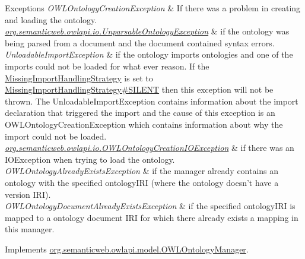 \begin{DoxyExceptions}{Exceptions}
{\em O\-W\-L\-Ontology\-Creation\-Exception} & If there was a problem in creating and loading the ontology. \\
\hline
{\em \hyperlink{classorg_1_1semanticweb_1_1owlapi_1_1io_1_1_unparsable_ontology_exception}{org.\-semanticweb.\-owlapi.\-io.\-Unparsable\-Ontology\-Exception}} & if the ontology was being parsed from a document and the document contained syntax errors. \\
\hline
{\em Unloadable\-Import\-Exception} & if the ontology imports ontologies and one of the imports could not be loaded for what ever reason. If the \hyperlink{}{Missing\-Import\-Handling\-Strategy} is set to \hyperlink{enumorg_1_1semanticweb_1_1owlapi_1_1model_1_1_missing_import_handling_strategy_aed66060ec95dc4ad59ca4dd82509782b}{Missing\-Import\-Handling\-Strategy\#\-S\-I\-L\-E\-N\-T} then this exception will not be thrown. The {\ttfamily Unloadable\-Import\-Exception} contains information about the import declaration that triggered the import and the cause of this exception is an {\ttfamily O\-W\-L\-Ontology\-Creation\-Exception} which contains information about why the import could not be loaded. \\
\hline
{\em \hyperlink{classorg_1_1semanticweb_1_1owlapi_1_1io_1_1_o_w_l_ontology_creation_i_o_exception}{org.\-semanticweb.\-owlapi.\-io.\-O\-W\-L\-Ontology\-Creation\-I\-O\-Exception}} & if there was an {\ttfamily I\-O\-Exception} when trying to load the ontology. \\
\hline
{\em O\-W\-L\-Ontology\-Already\-Exists\-Exception} & if the manager already contains an ontology with the specified {\ttfamily ontology\-I\-R\-I} (where the ontology doesn't have a version I\-R\-I). \\
\hline
{\em O\-W\-L\-Ontology\-Document\-Already\-Exists\-Exception} & if the specified {\ttfamily ontology\-I\-R\-I} is mapped to a ontology document I\-R\-I for which there already exists a mapping in this manager. \\
\hline
\end{DoxyExceptions}


Implements \hyperlink{interfaceorg_1_1semanticweb_1_1owlapi_1_1model_1_1_o_w_l_ontology_manager_a9052d0727f0bce1d7803cc876d638ca0}{org.\-semanticweb.\-owlapi.\-model.\-O\-W\-L\-Ontology\-Manager}.

